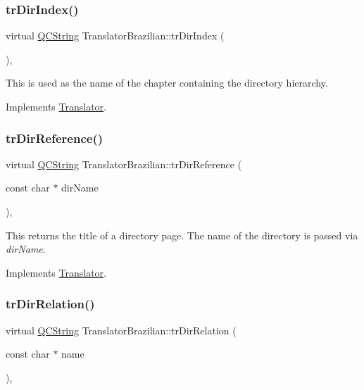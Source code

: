 \subsubsection{\texorpdfstring{trDirIndex()}{trDirIndex()}}
{\footnotesize\ttfamily virtual \mbox{\hyperlink{class_q_c_string}{Q\+C\+String}} Translator\+Brazilian\+::tr\+Dir\+Index (\begin{DoxyParamCaption}{ }\end{DoxyParamCaption})\hspace{0.3cm}{\ttfamily [inline]}, {\ttfamily [virtual]}}

This is used as the name of the chapter containing the directory hierarchy. 

Implements \mbox{\hyperlink{class_translator}{Translator}}.

\mbox{\label{class_translator_brazilian_a4edeef12c98c90d8f5d7f8c7fabd4729}} 
\subsubsection{\texorpdfstring{trDirReference()}{trDirReference()}}
{\footnotesize\ttfamily virtual \mbox{\hyperlink{class_q_c_string}{Q\+C\+String}} Translator\+Brazilian\+::tr\+Dir\+Reference (\begin{DoxyParamCaption}\item[{const char $\ast$}]{dir\+Name }\end{DoxyParamCaption})\hspace{0.3cm}{\ttfamily [inline]}, {\ttfamily [virtual]}}

This returns the title of a directory page. The name of the directory is passed via {\itshape dir\+Name}. 

Implements \mbox{\hyperlink{class_translator}{Translator}}.

\mbox{\label{class_translator_brazilian_abc74d9c245b189c95be94ba8a22cb4d2}} 
\subsubsection{\texorpdfstring{trDirRelation()}{trDirRelation()}}
{\footnotesize\ttfamily virtual \mbox{\hyperlink{class_q_c_string}{Q\+C\+String}} Translator\+Brazilian\+::tr\+Dir\+Relation (\begin{DoxyParamCaption}\item[{const char $\ast$}]{name }\end{DoxyParamCaption})\hspace{0.3cm}{\ttfamily [inline]}, {\ttfamily [virtual]}}

